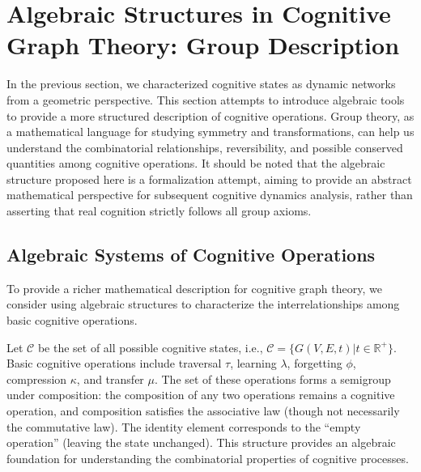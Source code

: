 \documentclass[10pt,onecolumn]{article}
\newcommand{\cognitivespace}{\mathcal{C}}
\begin{document}
\section{Algebraic Structures in Cognitive Graph Theory: Group Description}

In the previous section, we characterized cognitive states as dynamic networks from a geometric perspective. This section attempts to introduce algebraic tools to provide a more structured description of cognitive operations. Group theory, as a mathematical language for studying symmetry and transformations, can help us understand the combinatorial relationships, reversibility, and possible conserved quantities among cognitive operations. It should be noted that the algebraic structure proposed here is a formalization attempt, aiming to provide an abstract mathematical perspective for subsequent cognitive dynamics analysis, rather than asserting that real cognition strictly follows all group axioms.

\subsection{Algebraic Systems of Cognitive Operations}

To provide a richer mathematical description for cognitive graph theory, we consider using algebraic structures to characterize the interrelationships among basic cognitive operations.

Let $\cognitivespace$ be the set of all possible cognitive states, i.e., $\cognitivespace = \{G(V,E,t) | t \in \mathbb{R}^+\}$. Basic cognitive operations include traversal $\tau$, learning $\lambda$, forgetting $\phi$, compression $\kappa$, and transfer $\mu$. The set of these operations forms a semigroup under composition: the composition of any two operations remains a cognitive operation, and composition satisfies the associative law (though not necessarily the commutative law). The identity element corresponds to the “empty operation” (leaving the state unchanged). This structure provides an algebraic foundation for understanding the combinatorial properties of cognitive processes.
\end{document}
